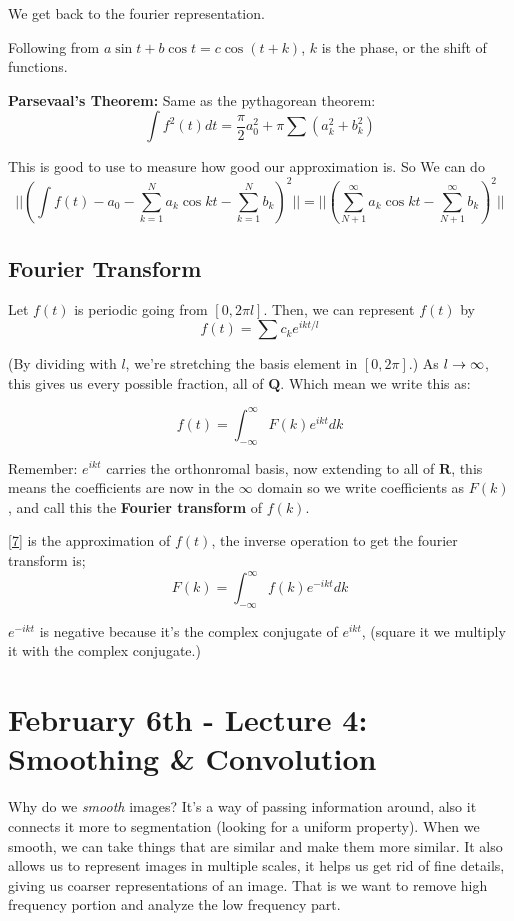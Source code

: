 We get back to the fourier representation.

Following from $a \sin t + b \cos t = c \cos (t + k)$, $k$ is the phase, or the shift
of functions.

\textbf{Parsevaal's Theorem:} Same as the pythagorean theorem:
$$\int f^2(t) dt = \frac{\pi}{2}a_0^2 + \pi\sum (a_k^2 + b_k^2)$$

This is good to use to measure how good our approximation is. 
So  
We can do $$
||(\int f(t) - a_0 -\sum_{k=1}^N a_k \cos kt - \sum_{k=1}^N
b_k)^2||  = ||(\sum_{N+1}^\infty a_k \cos kt - \sum_{N+1}^\infty b_k )^2||$$


\subsection{Fourier Transform}
\label{sec:fourier-transform-1}
Let $f(t)$ is periodic going from $[0, 2\pi l]$. Then, we can
represent $f(t)$ by
$$
  f(t)= \sum c_k e^{ikt/ l}
$$

(By dividing with $l$, we're stretching the basis element in $[0,
2\pi]$.) As $l\rightarrow \infty$, this gives us every possible fraction,
all of $\mathbf{Q}$. Which mean we write this as:

\begin{equation}
  \label{eq:7}
  f(t)= \int_{-\infty}^\infty F(k)e^{ikt}dk
\end{equation}

Remember: $e^{ikt}$ carries the orthonromal basis, now extending to
all of $\mathbf{R}$, this means the coefficients are now in the
$\infty$ domain so we write coefficients as $F(k)$, and call this the
\textbf{Fourier transform} of $f(k)$.

\eqref{7} is the approximation of $f(t)$, the inverse operation to get
the fourier transform is;
\begin{equation}
  \label{eq:9}
F(k) = \int_{-\infty}^\infty f(k)e^{-ikt}dk  
\end{equation}

$e^{-ikt}$ is negative because it's the complex conjugate of
$e^{ikt}$, (square it we multiply
it with the complex conjugate.)
\pagebreak
\section{February 6th - Lecture 4: Smoothing \& Convolution}
\label{sec:lecture-4}

Why do we \emph{smooth} images? It's a way of passing information around, also it
connects it more to segmentation (looking for a uniform
property). When we smooth, we can take things that are similar and
make them more similar. It also allows us to represent images in
multiple scales, it helps us get rid of fine details, giving us coarser
representations of an image. That is we want to remove high frequency portion and
analyze the low frequency part. 

